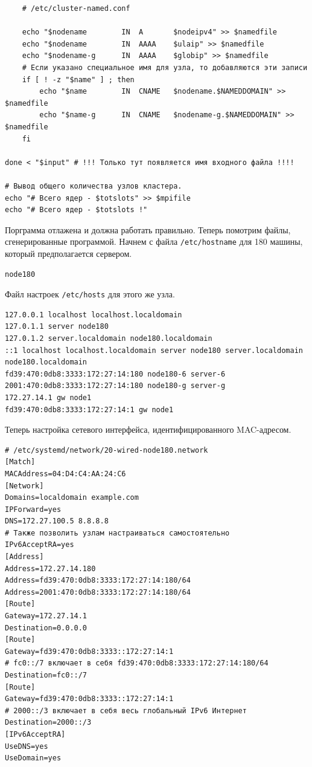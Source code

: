 \documentclass[12pt]{article}
\begin{document}
\begin{verbatim}
    # /etc/cluster-named.conf

    echo "$nodename        IN  A       $nodeipv4" >> $namedfile
    echo "$nodename        IN  AAAA    $ulaip" >> $namedfile
    echo "$nodename-g      IN  AAAA    $globip" >> $namedfile
    # Если указано специальное имя для узла, то добавляются эти записи
    if [ ! -z "$name" ] ; then
        echo "$name        IN  CNAME   $nodename.$NAMEDDOMAIN" >> $namedfile
        echo "$name-g      IN  CNAME   $nodename-g.$NAMEDDOMAIN" >> $namedfile
    fi

done < "$input" # !!! Только тут появляется имя входного файла !!!!

# Вывод общего количества узлов кластера.
echo "# Всего ядер - $totslots" >> $mpifile
echo "# Всего ядер - $totslots !"
\end{verbatim}

Порграмма отлажена и должна работать правильно. Теперь помотрим файлы, сгенерированные программой. Начнем с файла \texttt{/etc/hostname} для 180 машины, который предполагается сервером.
\begin{verbatim}
node180
\end{verbatim}

Файл настроек \texttt{/etc/hosts} для этого же узла.
\begin{verbatim}
127.0.0.1 localhost localhost.localdomain
127.0.1.1 server node180
127.0.1.2 server.localdomain node180.localdomain
::1 localhost localhost.localdomain server node180 server.localdomain node180.localdomain
fd39:470:0db8:3333:172:27:14:180 node180-6 server-6
2001:470:0db8:3333:172:27:14:180 node180-g server-g
172.27.14.1 gw node1
fd39:470:0db8:3333:172:27:14:1 gw node1
\end{verbatim}

Теперь настройка сетевого интерфейса, идентифицированного MAC-адресом.
\begin{verbatim}
# /etc/systemd/network/20-wired-node180.network
[Match]
MACAddress=04:D4:C4:AA:24:C6
[Network]
Domains=localdomain example.com
IPForward=yes
DNS=172.27.100.5 8.8.8.8
# Также позволить узлам настраиваться самостоятельно
IPv6AcceptRA=yes
[Address]
Address=172.27.14.180
Address=fd39:470:0db8:3333:172:27:14:180/64
Address=2001:470:0db8:3333:172:27:14:180/64
[Route]
Gateway=172.27.14.1
Destination=0.0.0.0
[Route]
Gateway=fd39:470:0db8:3333::172:27:14:1
# fc0::/7 включает в себя fd39:470:0db8:3333:172:27:14:180/64
Destination=fc0::/7
[Route]
Gateway=fd39:470:0db8:3333::172:27:14:1
# 2000::/3 включает в себя весь глобальный IPv6 Интернет
Destination=2000::/3
[IPv6AcceptRA]
UseDNS=yes
UseDomain=yes
\end{verbatim}
\end{document}
